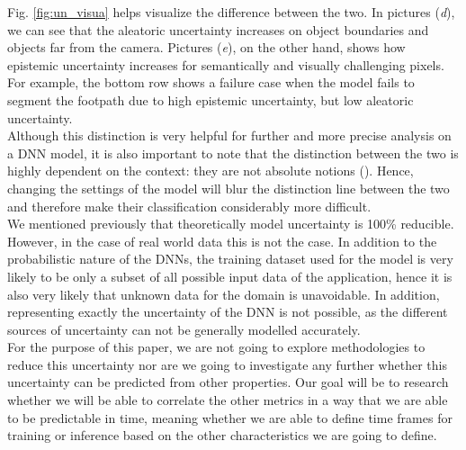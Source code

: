 Fig. \ref{fig:un_visua} helps visualize the difference between the two. In pictures (\textit{d}), we can see that the aleatoric uncertainty increases on object boundaries and objects far from the camera. Pictures (\textit{e}), on the other hand, shows how epistemic uncertainty increases for semantically and visually challenging pixels. For example, the bottom row shows a failure case when the model fails to segment the footpath due to high epistemic uncertainty, but low aleatoric uncertainty. \cite{DBLP:journals/corr/KendallG17}\\
Although this distinction is very helpful for further and more precise analysis on a DNN model, it is also important to note that the distinction between the two is highly dependent on the context: they are not absolute notions (\cite{KIUREGHIAN2009105}). Hence, changing the settings of the model will blur the distinction line between the two and therefore make their classification considerably more difficult. \cite{Separation_uncer}\\
We mentioned previously that theoretically model uncertainty is 100\% reducible. However, in the case of real world data this is not the case. In addition to the probabilistic nature of the DNNs, the training dataset used for the model is very likely to be only a subset of all possible input data of the application, hence it is also very likely that unknown data for the domain is unavoidable. In addition, representing exactly the uncertainty of the DNN is not possible, as the different sources of uncertainty can not be generally modelled accurately. \cite{gawlikowski2021survey}\\

For the purpose of this paper, we are not going to explore methodologies to reduce this uncertainty nor are we going to investigate any further whether this uncertainty can be predicted from other properties. Our goal will be to research whether we will be able to correlate the other metrics in a way that we are able to be predictable in time, meaning whether we are able to define time frames for training or inference based on the other characteristics we are going to define. 

